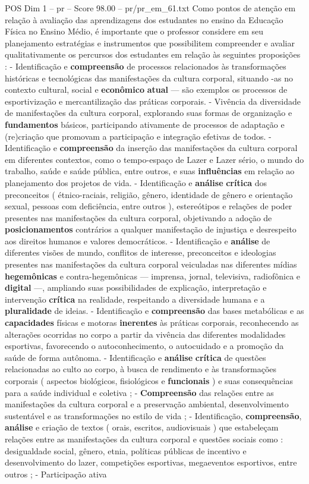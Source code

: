 \begin{textsample}{POS Dim 1 – pr – Score 98.00 – pr/pr\_em\_61.txt}
Como pontos de atenção em relação à avaliação das aprendizagens dos estudantes no ensino da Educação Física no Ensino Médio, é importante que o professor considere em seu planejamento estratégias e instrumentos que possibilitem compreender e avaliar qualitativamente os percursos dos estudantes em relação às seguintes proposições : - Identificação e \textbf{compreensão} de processos relacionados às transformações históricas e tecnológicas das manifestações da cultura corporal, situando -as no contexto cultural, social e \textbf{econômico} \textbf{atual} — são exemplos os processos de esportivização e mercantilização das práticas corporais. - Vivência da diversidade de manifestações da cultura corporal, explorando suas formas de organização e \textbf{fundamentos} básicos, participando ativamente de processos de adaptação e (re)criação que promovam a participação e integração efetivas de todos. - Identificação e \textbf{compreensão} da inserção das manifestações da cultura corporal em diferentes contextos, como o tempo-espaço de Lazer e Lazer sério, o mundo do trabalho, saúde e saúde pública, entre outros, e suas \textbf{influências} em relação ao planejamento dos projetos de vida. - Identificação e \textbf{análise} \textbf{crítica} dos preconceitos ( étnico-raciais, religião, gênero, identidade de gênero e orientação sexual, pessoas com deficiência, entre outros ), estereótipos e relações de poder presentes nas manifestações da cultura corporal, objetivando a adoção de \textbf{posicionamentos} contrários a qualquer manifestação de injustiça e desrespeito aos direitos humanos e valores democráticos. - Identificação e \textbf{análise} de diferentes visões de mundo, conflitos de interesse, preconceitos e ideologias presentes nas manifestações da cultura corporal veiculadas nas diferentes mídias \textbf{hegemônicas} e contra-hegemônicas — imprensa, jornal, televisiva, radiofônica e \textbf{digital} —, ampliando suas possibilidades de explicação, interpretação e intervenção \textbf{crítica} na realidade, respeitando a diversidade humana e a \textbf{pluralidade} de ideias. - Identificação e \textbf{compreensão} das bases metabólicas e as \textbf{capacidades} físicas e motoras \textbf{inerentes} às práticas corporais, reconhecendo as alterações ocorridas no corpo a partir da vivência das diferentes modalidades esportivas, favorecendo o autoconhecimento, o autocuidado e a promoção da saúde de forma autônoma. - Identificação e \textbf{análise} \textbf{crítica} de questões relacionadas ao culto ao corpo, à busca de rendimento e às transformações corporais ( aspectos biológicos, fisiológicos e \textbf{funcionais} ) e suas consequências para a saúde individual e coletiva ; - \textbf{Compreensão} das relações entre as manifestações da cultura corporal e a preservação ambiental, desenvolvimento sustentável e as transformações no estilo de vida ; - Identificação, \textbf{compreensão}, \textbf{análise} e criação de textos ( orais, escritos, audiovisuais ) que estabeleçam relações entre as manifestações da cultura corporal e questões sociais como : desigualdade social, gênero, etnia, políticas públicas de incentivo e desenvolvimento do lazer, competições esportivas, megaeventos esportivos, entre outros ; - Participação ativa 
\end{textsample}
